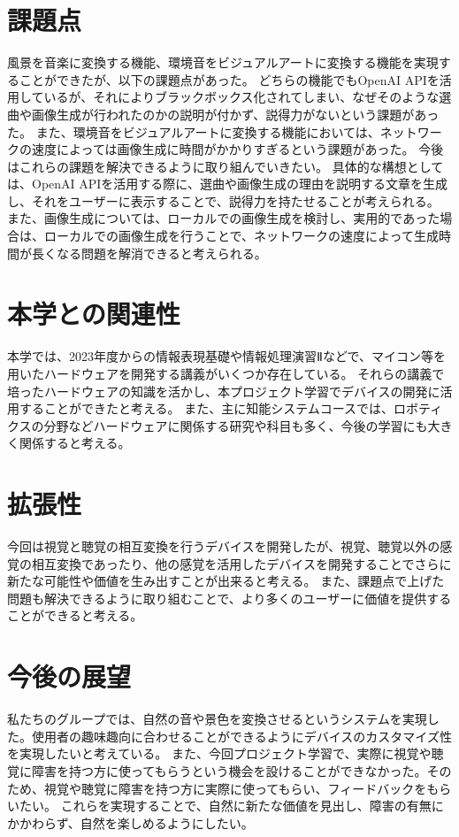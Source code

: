 \section{課題点}
風景を音楽に変換する機能、環境音をビジュアルアートに変換する機能を実現することができたが、以下の課題点があった。
どちらの機能でもOpenAI APIを活用しているが、それによりブラックボックス化されてしまい、なぜそのような選曲や画像生成が行われたのかの説明が付かず、説得力がないという課題があった。
また、環境音をビジュアルアートに変換する機能においては、ネットワークの速度によっては画像生成に時間がかかりすぎるという課題があった。
今後はこれらの課題を解決できるように取り組んでいきたい。
具体的な構想としては、OpenAI APIを活用する際に、選曲や画像生成の理由を説明する文章を生成し、それをユーザーに表示することで、説得力を持たせることが考えられる。
また、画像生成については、ローカルでの画像生成を検討し、実用的であった場合は、ローカルでの画像生成を行うことで、ネットワークの速度によって生成時間が長くなる問題を解消できると考えられる。

\section{本学との関連性}
本学では、2023年度からの情報表現基礎や情報処理演習Ⅱなどで、マイコン等を用いたハードウェアを開発する講義がいくつか存在している。
それらの講義で培ったハードウェアの知識を活かし、本プロジェクト学習でデバイスの開発に活用することができたと考える。
また、主に知能システムコースでは、ロボティクスの分野などハードウェアに関係する研究や科目も多く、今後の学習にも大きく関係すると考える。

\section{拡張性}
今回は視覚と聴覚の相互変換を行うデバイスを開発したが、視覚、聴覚以外の感覚の相互変換であったり、他の感覚を活用したデバイスを開発することでさらに新たな可能性や価値を生み出すことが出来ると考える。
また、課題点で上げた問題も解決できるように取り組むことで、より多くのユーザーに価値を提供することができると考える。

\section{今後の展望}
私たちのグループでは、自然の音や景色を変換させるというシステムを実現した。使用者の趣味趣向に合わせることができるようにデバイスのカスタマイズ性を実現したいと考えている。
また、今回プロジェクト学習で、実際に視覚や聴覚に障害を持つ方に使ってもらうという機会を設けることができなかった。そのため、視覚や聴覚に障害を持つ方に実際に使ってもらい、フィードバックをもらいたい。
これらを実現することで、自然に新たな価値を見出し、障害の有無にかかわらず、自然を楽しめるようにしたい。  

\newpage\clearpage
\vspace*{-20pt}
\printbibliography[segment=\therefsegment,heading=subbibliography]
